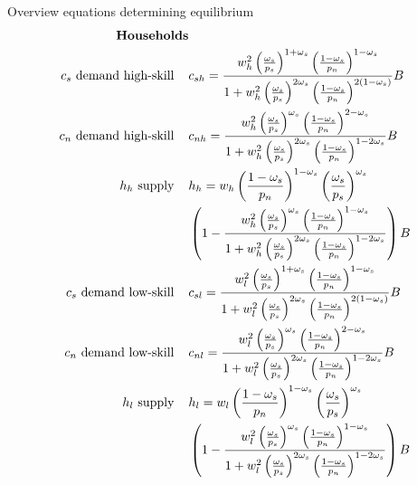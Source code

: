 \newpage
Overview equations determining equilibrium 
\begin{align}
\text{\textbf{Households}}& \nonumber \\
\text{$c_s$ demand high-skill}\hspace{4mm}&c_{sh}=\frac{w_h^2\left(\frac{\omega_s}{p_s}\right)^{1+\omega_s}\left(\frac{1-\omega_s}{p_n}\right)^{1-\omega_s}}{1+w_h^2\left(\frac{\omega_s}{p_s}\right)^{2\omega_s}\left(\frac{1-\omega_s}{p_n}\right)^{2(1-\omega_s)}}B\\
\text{$c_n$ demand high-skill}\hspace{4mm}&c_{nh} = \frac{w_h^2\left(\frac{\omega_s}{p_s}\right)^{\omega_s}\left(\frac{1-\omega_s}{p_n}\right)^{2-\omega_s}}{1+w_h^2\left(\frac{\omega_s}{p_s}\right)^{2\omega_s}\left(\frac{1-\omega_s}{p_n}\right)^{1-2\omega_s}}B\\
\text{$h_h$ supply}\hspace{4mm}&
h_h= w_h \left(\frac{1-\omega_s}{p_n}\right)^{1-\omega_s}\left(\frac{\omega_s}{p_s}\right)^{\omega_s}\\ & \left(1-
\frac{w_h^2\left(\frac{\omega_s}{p_s}\right)^{\omega_s}\left(\frac{1-\omega_s}{p_n}\right)^{1-\omega_s}}{1+w_h^2\left(\frac{\omega_s}{p_s}\right)^{2\omega_s}\left(\frac{1-\omega_s}{p_n}\right)^{1-2\omega_s}}\right)B\\
\text{$c_s$ demand low-skill}\hspace{4mm}&c_{sl}=\frac{w_l^2\left(\frac{\omega_s}{p_s}\right)^{1+\omega_s}\left(\frac{1-\omega_s}{p_n}\right)^{1-\omega_s}}{1+w_l^2\left(\frac{\omega_s}{p_s}\right)^{2\omega_s}\left(\frac{1-\omega_s}{p_n}\right)^{2(1-\omega_s)}}B\\
\text{$c_n$ demand low-skill}\hspace{4mm}&c_{nl}=\frac{w_l^2\left(\frac{\omega_s}{p_s}\right)^{\omega_s}\left(\frac{1-\omega_s}{p_n}\right)^{2-\omega_s}}{1+w_l^2\left(\frac{\omega_s}{p_s}\right)^{2\omega_s}\left(\frac{1-\omega_s}{p_n}\right)^{1-2\omega_s}}B\\
\text{$h_l$ supply}\hspace{4mm}& h_l= w_l \left(\frac{1-\omega_s}{p_n}\right)^{1-\omega_s}\left(\frac{\omega_s}{p_s}\right)^{\omega_s}\\ &\left(1-
\frac{w_l^2\left(\frac{\omega_s}{p_s}\right)^{\omega_s}\left(\frac{1-\omega_s}{p_n}\right)^{1-\omega_s}}{1+w_l^2\left(\frac{\omega_s}{p_s}\right)^{2\omega_s}\left(\frac{1-\omega_s}{p_n}\right)^{1-2\omega_s}}\right)B
\end{align}
\newpage
